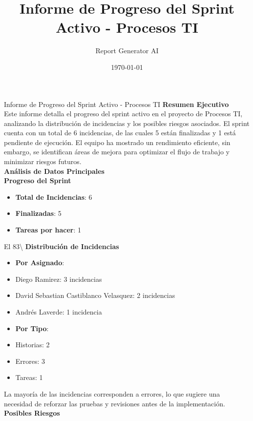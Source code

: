 \documentclass{beamer}
\title{Informe de Progreso del Sprint Activo - Procesos TI}
\author{Report Generator AI}
\date{\today}
\begin{document}
\frame{\titlepage}

\begin{frame}{Informe de Progreso del Sprint Activo - Procesos TI}
\textbf{Resumen Ejecutivo}\\[1ex]
Este informe detalla el progreso del sprint activo en el proyecto de Procesos TI, analizando la distribución de incidencias y los posibles riesgos asociados. El sprint cuenta con un total de 6 incidencias, de las cuales 5 están finalizadas y 1 está pendiente de ejecución. El equipo ha mostrado un rendimiento eficiente, sin embargo, se identifican áreas de mejora para optimizar el flujo de trabajo y minimizar riesgos futuros.\\
\textbf{Análisis de Datos Principales}\\[1ex]
\textbf{\small Progreso del Sprint}\\[0.5ex]
\begin{itemize}
\item \textbf{Total de Incidencias}: 6
\item \textbf{Finalizadas}: 5
\item \textbf{Tareas por hacer}: 1
\end{itemize}
El 83\textbackslash{}%
\textbf{\small Distribución de Incidencias}\\[0.5ex]
\begin{itemize}
\item \textbf{Por Asignado}:
\item Diego Ramirez: 3 incidencias
\item David Sebastian Castiblanco Velasquez: 2 incidencias
\item Andrés Laverde: 1 incidencia
\end{itemize}
\begin{itemize}
\item \textbf{Por Tipo}:
\item Historias: 2
\item Errores: 3
\item Tareas: 1
\end{itemize}
La mayoría de las incidencias corresponden a errores, lo que sugiere una necesidad de reforzar las pruebas y revisiones antes de la implementación.\\
\textbf{\small Posibles Riesgos}\\[0.5ex]

\end{frame}
\end{document}
